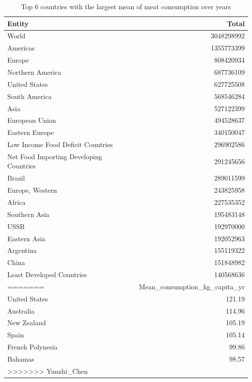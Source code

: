 \documentclass[11pt,a4paper,]{article}
\begin{document}
\begin{table}

\caption{\label{tab:poultry}Poultry meat production, 1961-2018}
\centering
\begin{tabular}[t]{lr}
\toprule
Entity & Total\\
\midrule
World & 3048298992\\
Americas & 1355773399\\
Europe & 808420934\\
Northern America & 687736109\\
United States & 627725508\\
\addlinespace
South America & 568546284\\
Asia & 527122399\\
European Union & 494528637\\
Eastern Europe & 340150047\\
Low Income Food Deficit Countries & 296902586\\
\addlinespace
Net Food Importing Developing Countries & 291245656\\
Brazil & 289011599\\
Europe, Western & 243825958\\
Africa & 227535352\\
Southern Asia & 195483148\\
\addlinespace
USSR & 192970000\\
Eastern Asia & 192052963\\
Argentina & 155119322\\
China & 151848982\\
Least Developed Countries & 140568636\\
\bottomrule
=======
\caption{\label{tab:highest-meanconsumption}Top 6 countries with the largest mean of meat consumption over years}
\centering
\begin{tabular}[t]{l|r}
\hline
Country & Mean\_consumption\_kg\_capita\_yr\\
\hline
United States & 121.19\\
\hline
Australia & 114.96\\
\hline
New Zealand & 105.19\\
\hline
Spain & 105.14\\
\hline
French Polynesia & 99.86\\
\hline
Bahamas & 98.57\\
\hline
>>>>>>> Yunzhi_Chen
\end{tabular}
\end{table}
\clearpage
\end{document}
